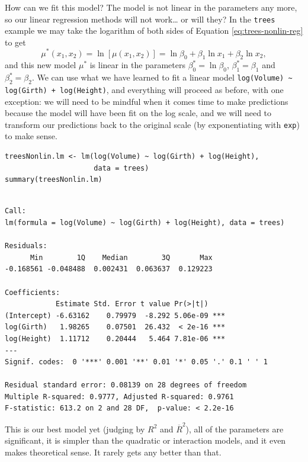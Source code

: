 \documentclass[captions=tableheading]{scrbook}
\begin{document}
How can we fit this model? The model is not linear in the parameters any more, so our linear regression methods will not work\ldots{} or will they? In the \texttt{trees} example we may take the logarithm of both sides of Equation \ref{eq:trees-nonlin-reg} to get
\begin{equation}
\mu^{\ast}(x_{1},x_{2})=\ln\left[\mu(x_{1},x_{2})\right]=\ln\beta_{0}+\beta_{1}\ln x_{1}+\beta_{2}\ln x_{2},
\end{equation}
and this new model $\mu^{\ast}$ is linear in the parameters $\beta_{0}^{\ast}=\ln\beta_{0}$, $\beta_{1}^{\ast}=\beta_{1}$ and $\beta_{2}^{\ast}=\beta_{2}$. We can use what we have learned to fit a linear model \texttt{log(Volume) \textasciitilde{} log(Girth) + log(Height)}, and everything will proceed as before, with one exception: we will need to be mindful when it comes time to make predictions because the model will have been fit on the log scale, and we will need to transform our predictions back to the original scale (by exponentiating with \texttt{exp}) to make sense.


\begin{verbatim}
treesNonlin.lm <- lm(log(Volume) ~ log(Girth) + log(Height), 
                     data = trees)
summary(treesNonlin.lm)
\end{verbatim}


\begin{verbatim}
 
Call:
lm(formula = log(Volume) ~ log(Girth) + log(Height), data = trees)

Residuals:
      Min        1Q    Median        3Q       Max 
-0.168561 -0.048488  0.002431  0.063637  0.129223 

Coefficients:
            Estimate Std. Error t value Pr(>|t|)    
(Intercept) -6.63162    0.79979  -8.292 5.06e-09 ***
log(Girth)   1.98265    0.07501  26.432  < 2e-16 ***
log(Height)  1.11712    0.20444   5.464 7.81e-06 ***
---
Signif. codes:  0 '***' 0.001 '**' 0.01 '*' 0.05 '.' 0.1 ' ' 1 

Residual standard error: 0.08139 on 28 degrees of freedom
Multiple R-squared: 0.9777,	Adjusted R-squared: 0.9761 
F-statistic: 613.2 on 2 and 28 DF,  p-value: < 2.2e-16
\end{verbatim}

This is our best model yet (judging by $R^{2}$ and $\overline{R}^{2}$), all of the parameters are significant, it is simpler than the quadratic or interaction models, and it even makes theoretical sense. It rarely gets any better than that.
\end{document}
